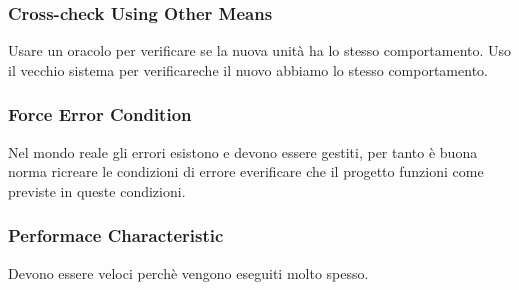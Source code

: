 \subsubsection{Cross-check Using Other Means}
Usare un oracolo per verificare se la nuova unità ha lo stesso comportamento.
Uso il vecchio sistema per verificareche il nuovo abbiamo lo stesso comportamento.

\subsubsection{Force Error Condition}
Nel mondo reale gli errori esistono e devono essere gestiti, per tanto è buona norma ricreare le condizioni di errore everificare che il progetto funzioni come previste in queste condizioni.

\subsubsection{Performace Characteristic}
Devono essere veloci perchè vengono eseguiti molto spesso.

